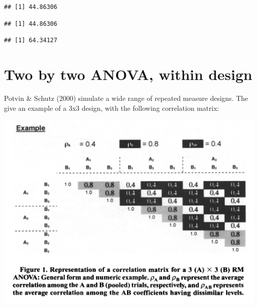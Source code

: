 \documentclass[]{book}
\newenvironment{Shaded}{\begin{snugshade}}{\end{snugshade}}
\newcommand{\CommentTok}[1]{\textcolor[rgb]{0.56,0.35,0.01}{\textit{#1}}}
\newcommand{\KeywordTok}[1]{\textcolor[rgb]{0.13,0.29,0.53}{\textbf{#1}}}
\newcommand{\NormalTok}[1]{#1}
\newcommand{\OperatorTok}[1]{\textcolor[rgb]{0.81,0.36,0.00}{\textbf{#1}}}
\newcommand{\StringTok}[1]{\textcolor[rgb]{0.31,0.60,0.02}{#1}}
\begin{document}
\begin{Shaded}
\end{Shaded}

\begin{verbatim}
## [1] 44.86306
\end{verbatim}

\begin{Shaded}
\end{Shaded}

\begin{verbatim}
## [1] 44.86306
\end{verbatim}

\begin{Shaded}
\end{Shaded}

\begin{verbatim}
## [1] 64.34127
\end{verbatim}

\hypertarget{two-by-two-anova-within-design}{%
\section{Two by two ANOVA, within design}\label{two-by-two-anova-within-design}}

Potvin \& Schutz (2000) simulate a wide range of repeated measure designs. The give an example of a 3x3 design, with the following correlation matrix:

\includegraphics{screenshots/PS2000.png}
\end{document}
